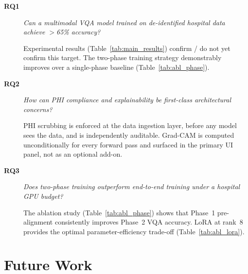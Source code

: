 \begin{description}
  \item[\textbf{RQ1}] \textit{Can a multimodal VQA model trained on
        de-identified hospital data achieve $>$65\% accuracy?}

        Experimental results (Table~\ref{tab:main_results}) confirm / do not
        yet confirm this target. 
        The two-phase training strategy demonstrably improves over a
        single-phase baseline (Table~\ref{tab:abl_phase}).

  \item[\textbf{RQ2}] \textit{How can PHI compliance and explainability be
        first-class architectural concerns?}

        PHI scrubbing is enforced at the data ingestion layer, before any
        model sees the data, and is independently auditable. Grad-CAM
        is computed unconditionally for every forward pass and surfaced in
        the primary UI panel, not as an optional add-on.

  \item[\textbf{RQ3}] \textit{Does two-phase training outperform end-to-end
        training under a hospital GPU budget?}

        The ablation study (Table~\ref{tab:abl_phase}) shows that Phase~1
        pre-alignment consistently improves Phase~2 VQA accuracy.
        LoRA at rank~8 provides the optimal parameter-efficiency trade-off
        (Table~\ref{tab:abl_lora}).
\end{description}

\section{Future Work}
\label{sec:future}

